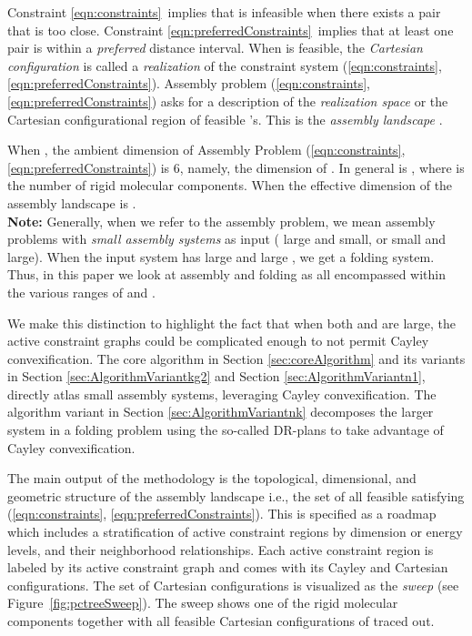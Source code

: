 \documentclass[]{article}
\newcommand{\figref}[1]{Figure~\ref{#1}}
\newcommand{\rmc}{rigid molecular component}
\newcommand{\ctwo}{\ref{eqn:preferredConstraints}}
\newcommand{\cone}{\ref{eqn:constraints}}
\begin{document}
\noindent Constraint \cone\ implies that  is infeasible when there exists a
pair  that is too close. Constraint \ctwo\ implies that at
least one pair  is within a \emph{preferred} distance
interval.  When  is feasible, the \emph{Cartesian configuration} 
is called a \emph{realization} of the constraint system (\cone, \ctwo).
Assembly problem (\cone, \ctwo) asks for a description of the \emph{realization
space} or the Cartesian configurational region of feasible 's.
This is the \emph{assembly landscape} .

When , the ambient dimension of Assembly Problem (\cone, \ctwo) 
is 6, namely, the dimension of . In general  is , where  is
the number of \rmc s. When  the effective
dimension  of the assembly landscape is .\\

\noindent\textbf{Note:} Generally, when we refer to the assembly problem, we mean 
assembly problems with \emph{small assembly systems} as input ( large and 
small, or  small and  large). When the input system has large  and 
large , we get a folding system. Thus, in this paper we look at assembly and 
folding as all encompassed within the various ranges of  and . 

We make this distinction to highlight the fact that when both  and  are 
large, the active constraint graphs could be complicated enough to not permit
Cayley convexification. The core algorithm in Section
\ref{sec:coreAlgorithm} and its variants in Section \ref{sec:AlgorithmVariantkg2} 
and Section \ref{sec:AlgorithmVariantn1}, directly atlas small assembly systems, 
leveraging Cayley convexification. The algorithm variant in Section 
\ref{sec:AlgorithmVariantnk}  decomposes the larger system in a folding 
problem using the so-called DR-plans to take advantage of Cayley convexification.


The main output of the methodology is the topological, dimensional, and
geometric structure of the assembly landscape  i.e., the set of
all feasible  satisfying (\cone, \ctwo). This is specified
as a roadmap which includes a stratification of active constraint regions by
dimension or energy levels, and their neighborhood relationships.
Each active constraint region is labeled by its active constraint graph and
comes with its Cayley and Cartesian configurations.
The set of Cartesian configurations is visualized as the \emph{sweep} (see
\figref{fig:pctreeSweep}). The sweep shows one of the rigid molecular components 
 together with all feasible Cartesian configurations  of  
traced out.\\
\end{document}
